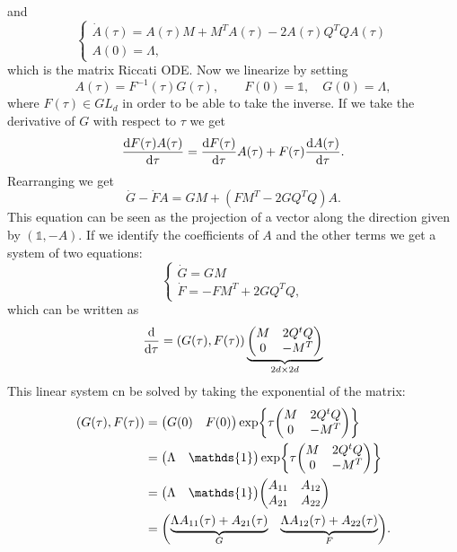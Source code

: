 and
\begin{equation*}
    \begin{cases}
        \dot{A}(\tau) = A(\tau)M + M^TA(\tau) - 2A(\tau)Q^TQA(\tau) \\
        A(0) = \Lambda,
    \end{cases}
\end{equation*}
which is the matrix Riccati ODE. Now we linearize by setting
\begin{equation*}
    A(\tau) = F^{-1}(\tau)G(\tau), \qquad F(0) = \mathds{1}, \quad G(0) = \Lambda,
\end{equation*}
where $F(\tau)\in GL_d$ in order to be able to take the inverse. If we take the derivative of $G$ with respect to $\tau$ we get
\begin{equation*}
    \dv{F(\tau)A(\tau)}{\tau} = \dv{F(\tau)}{\tau} A(\tau) + F(\tau)\dv{A(\tau)}{\tau}.
\end{equation*}
Rearranging we get
\begin{equation}
    \dot{G} - \dot{F}A = GM + (FM^T - 2GQ^TQ)A.
\end{equation}
This equation can be seen as the projection of a vector along the direction given by $(\mathds{1}, -A)$. If we identify the coefficients of $A$ and the other terms we get a system of two equations:
\begin{equation}
    \begin{cases}
        \dot{G} = GM \\
        \dot{F} = -FM^T + 2GQ^TQ,
    \end{cases}
\end{equation}
which can be written as
\begin{equation}
    \dv{}{\tau} (G(\tau), F(\tau)) = (G(\tau), F(\tau))\underbrace{\mqty(M & 2Q^tQ \\ 0 & -M^T)}_{2d\times 2d}
\end{equation}
This linear system cn be solved by taking the exponential of the matrix:
\begin{align}%
    \notag(G(\tau), F(\tau)) &= \mqty(G(0) & F(0))\exp{\tau\mqty(M & 2Q^tQ \\ 0 & -M^T)} \\
    &=
    \notag\mqty(\Lambda & \mathds{1})\exp{\tau\mqty(M & 2Q^tQ \\ 0 & -M^T)} \\
    &=
    \notag\mqty(\Lambda & \mathds{1})\mqty(A_{11} & A_{12} \\ A_{21} & A_{22}) \\
    &=
    \mqty(\underbrace{\Lambda A_{11}(\tau) + A_{21}(\tau)}_{G} & \underbrace{\Lambda A_{12}(\tau) + A_{22}(\tau)}_{F}).
\end{align}
